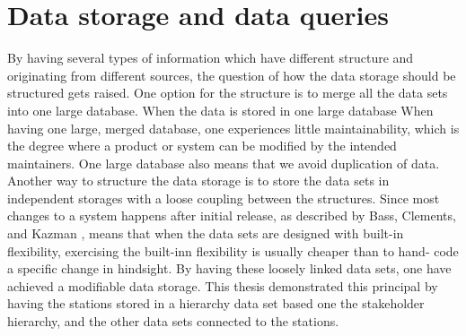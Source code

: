 
\section{Data storage and data queries} %
\label{sec:discussion_data_storage_and_data_queries}
By having several types of information which have different structure and
originating from different sources, the question of how the data storage should
be structured gets raised. One option for the structure is to merge all the
data sets into one large database. When the data is stored in one large
database
 When having one large, merged 
database, one experiences little maintainability, which is the degree where a
product or system can be modified by the intended maintainers\cite[p. 195]{Bass:2012:SAP:2392670}. 
One large database also means that we avoid duplication of data.
Another way to structure the data storage is to store the data sets in
independent storages with a loose coupling between the structures. Since most 
changes to a system happens after initial release, as described by Bass, 
Clements, and Kazman \cite[pp. 117-124]{Bass:2012:SAP:2392670},
means that when the data sets are designed with built-in flexibility, 
exercising the built-inn flexibility is usually cheaper than to hand-
code a specific change in hindsight. By having these loosely linked data sets,
one have achieved a modifiable data storage. This thesis demonstrated this
principal by having the stations stored in a hierarchy data set based one the 
stakeholder hierarchy, and the other data sets connected to the stations.\\




